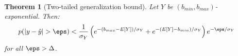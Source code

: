 \documentclass[]{article}
\newtheorem{theorem}{Theorem}[section]
\begin{document}



\begin{theorem}[Two-tailed generalization bound] \label{thm:pac_quant}
Let $Y$ be $(b_{min}, b_{max})$-exponential. Then:
\begin{align} \label{eq:bound_two_tailed}
    p(|y - \hat{y}| > \eps) <
                            \frac{1}{\sigma_Y} \left(
                                e^{-(b_{max}- E[Y]) / \sigma_Y}
                                + e^{-(E[Y] - b_{min}) / \sigma_Y}
                            \right)e^{-\eps / \sigma_Y}
\end{align}
for all $\eps > \Delta$.
\end{theorem}
\end{document}
